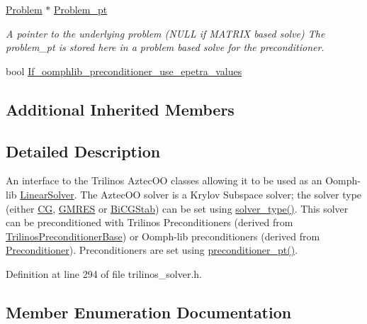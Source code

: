 \begin{DoxyCompactItemize}
\hyperlink{classoomph_1_1Problem}{Problem} $\ast$ \hyperlink{classoomph_1_1TrilinosAztecOOSolver_abc6a63eb67694f7ac5dfc8505a8b9a5f}{Problem\+\_\+pt}
\begin{DoxyCompactList}\small\item\em A pointer to the underlying problem (N\+U\+LL if M\+A\+T\+R\+IX based solve) The problem\+\_\+pt is stored here in a problem based solve for the preconditioner. \end{DoxyCompactList}\item 
bool \hyperlink{classoomph_1_1TrilinosAztecOOSolver_a028992b1b3fe1a501590aa71d4a879e8}{If\+\_\+oomphlib\+\_\+preconditioner\+\_\+use\+\_\+epetra\+\_\+values}
\end{DoxyCompactItemize}
\subsection*{Additional Inherited Members}


\subsection{Detailed Description}
An interface to the Trilinos Aztec\+OO classes allowing it to be used as an Oomph-\/lib \hyperlink{classoomph_1_1LinearSolver}{Linear\+Solver}. The Aztec\+OO solver is a Krylov Subspace solver; the solver type (either \hyperlink{classoomph_1_1CG}{CG}, \hyperlink{classoomph_1_1GMRES}{G\+M\+R\+ES} or \hyperlink{classoomph_1_1BiCGStab}{Bi\+C\+G\+Stab}) can be set using \hyperlink{classoomph_1_1TrilinosAztecOOSolver_a9169831da7460eec52071e8b3938bf97}{solver\+\_\+type()}. This solver can be preconditioned with Trilinos Preconditioners (derived from \hyperlink{classoomph_1_1TrilinosPreconditionerBase}{Trilinos\+Preconditioner\+Base}) or Oomph-\/lib preconditioners (derived from \hyperlink{classoomph_1_1Preconditioner}{Preconditioner}). Preconditioners are set using \hyperlink{classoomph_1_1IterativeLinearSolver_a800f699ec8dda290105807cb91297850}{preconditioner\+\_\+pt()}. 

Definition at line 294 of file trilinos\+\_\+solver.\+h.



\subsection{Member Enumeration Documentation}
\mbox{\label{classoomph_1_1TrilinosAztecOOSolver_a8a9d76e6cfa1594b150de04413c0f958}} 
